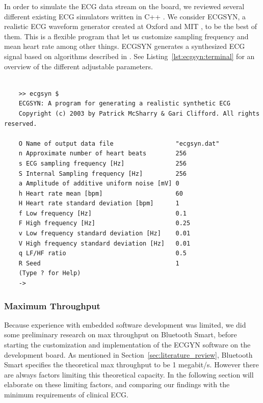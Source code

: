 In order to simulate the ECG data stream on the board, we reviewed several different existing ECG simulators written in C++ \cite{newRef:56, newRef:56:1, newRef:56:2}. We consider ECGSYN, a realistic ECG waveform generator created at Oxford and MIT \cite{newRef:56:2}, to be the best of them. This is a flexible program that let us customize sampling frequency and mean heart rate among other things. ECGSYN generates a synthesized ECG signal based on algorithms described in \cite{newRef:58}. See Listing~\ref{lst:ecgsyn:terminal} for an overview of the different adjustable parameters.

\begin{lstlisting}[caption={ECGSYN Commando Line Interface (CLI)}, label={lst:ecgsyn:terminal}, basicstyle=\tiny]

    >> ecgsyn $
    ECGSYN: A program for generating a realistic synthetic ECG
    Copyright (c) 2003 by Patrick McSharry & Gari Clifford. All rights reserved.
     
    O Name of output data file                 "ecgsyn.dat"
    n Approximate number of heart beats        256
    s ECG sampling frequency [Hz]              256
    S Internal Sampling frequency [Hz]         256
    a Amplitude of additive uniform noise [mV] 0
    h Heart rate mean [bpm]                    60
    H Heart rate standard deviation [bpm]      1
    f Low frequency [Hz]                       0.1
    F High frequency [Hz]                      0.25
    v Low frequency standard deviation [Hz]    0.01
    V High frequency standard deviation [Hz]   0.01
    q LF/HF ratio                              0.5
    R Seed                                     1
    (Type ? for Help)
    ->

\end{lstlisting}

\subsubsection{Maximum Throughput} %
\label{ssub:maximum_throughput}

Because experience with embedded software development was limited, we did some preliminary research on max throughput on Bluetooth Smart, before starting the customization and implementation of the ECGYN software on the development board. As mentioned in Section~\ref{sec:literature_review}, Bluetooth Smart specifies the theoretical max throughput to be 1 megabit/s. However there are always factors limiting this theoretical capacity. In the following section will elaborate on these limiting factors, and comparing our findings with the minimum requirements of clinical ECG.

